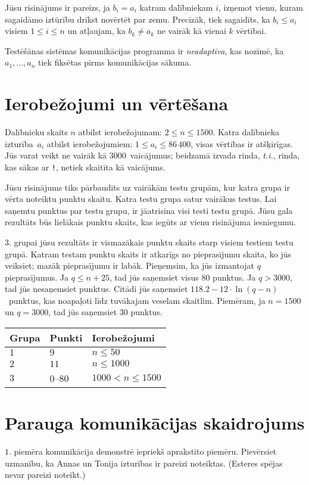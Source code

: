 Jūsu risinājums ir pareizs, ja $b_i=a_i$ katram dalībniekam $i$, izņemot vienu, kuram sagaidāmo iztūrību drīkst novērtēt par zemu. Precīzāk, tiek sagaidīts, ka $b_i\leq a_i$ visiem $1\leq i\leq n$ un atļaujam, ka $b_k \neq a_k$ ne vairāk kā vienai $k$ vērtībai.

Testēšānas sistēmas komunikācijas programma ir \emph{neadaptīva}, kas nozīmē, ka $a_1,\ldots, a_n$ tiek fiksētas pirms komunikācijas sākuma.


\section*{Ierobežojumi un vērtēšana}

Dalībnieku skaits $n$ atbilst ierobežojumam:
$2\leq n\leq 1500$. %
Katra dalībnieka izturība~$a_i$ atbilst ierobežojumiem: 
$1\leq a_i\leq 86\,400$, %
visas vērtības ir atšķirīgas. %
Jūs varat veikt 
ne vairāk kā $3000$~vaicājumus; %
beidzamā izvada rinda, \emph{t.i.}, rinda, kas sākas ar \texttt{!}, netiek skaitīta kā vaicājums.

Jūsu risinājums tiks pārbaudīts uz vairākām testu grupām, kur katra grupa ir vērta noteiktu punktu skaitu.
Katra testu grupa satur vairākus testus.
Lai saņemtu punktus par testu grupu, ir jāatrisina visi testi testu grupā.
Jūsu gala rezultāts būs lielākais punktu skaits, kas iegūts ar vienu risinājuma iesniegumu.

$3.$ grupai jūsu rezultāts ir vismazākais punktu skaits starp visiem testiem testu grupā.
Katram testam punktu skaits ir atkarīgs no pieprasījumu skaita, ko jūs veiksiet; 
mazāk pieprasījumu ir labāk.
Pieņemsim, ka jūs izmantojat $q$ pieprasījumus.
Ja $q \le n+25$, tad jūs saņemsiet visus $80$ punktus.
Ja $q > 3000$, tad jūs nesaņemsiet punktus.
Citādi jūs saņemsiet 
$118.2 - 12 \cdot \ln(q - n)$~punktus, kas noapaļoti līdz tuvākajam veselam skaitlim. %
Piemēram, ja $n = 1500$ un $q = 3000$, tad jūs saņemsiet $30$ punktus.

\medskip
\begin{tabular}{lll}
Grupa & Punkti & Ierobežojumi\\\hline
$1$  &  $9$ & $n\leq 50$\\
$2$  &  $11$ & $n\leq 1000$\\
$3$  &  $0$--$80$ & $1000 < n\leq 1500$\\
\end{tabular}

\section*{Parauga komunikācijas skaidrojums}

$1.$ piemēra komunikācija demonstrē iepriekš aprakstīto piemēru.
Pievērsiet uzmanību, ka Annas un Tonija izturības ir pareizi noteiktas.
(Esteres spējas nevar pareizi noteikt.)
